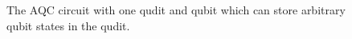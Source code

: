 \begin{figure}
    \begin{center}
    \caption{The AQC circuit with one qudit and qubit which can store arbitrary qubit states in the qudit.}
    \label{fig:aqc_qbit_store}
    \end{center}
\end{figure}

